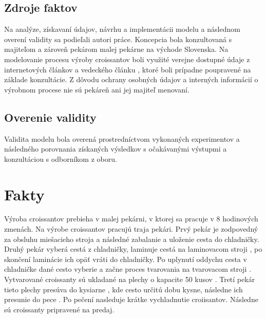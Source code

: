 \documentclass[11pt]{article}
\begin{document}
\subsection{Zdroje faktov}
Na analýze, získavaní údajov, návrhu a implementácii modelu a následnom overení validity sa podieľali autori práce. Koncepcia bola konzultovaná s majiteľom a zároveň pekárom malej pekárne na východe Slovenska. Na modelovanie procesu výroby croissantov boli využité verejne dostupné údaje z internetových článkov a vedeckého článku \cite{MUTCHADEJ2025101370}, ktoré boli prípadne poupravené na základe konzultácie. Z dôvodu ochrany osobných údajov a interných informácií o výrobnom procese nie sú pekáreň ani jej majiteľ menovaní.

\subsection{Overenie validity}
Validita modelu bola overená prostredníctvom vykonaných experimentov a následného porovnania získaných výsledkov s očakávanými výstupmi a konzultáciou s odborníkom z oboru.

\section{Fakty}
Výroba croissantov prebieha v malej pekárni, v ktorej sa pracuje v 8 hodinových zmenách.
Na výrobe croissantov pracujú traja pekári. Prvý pekár je zodpovedný za obsluhu miešacieho stroja \cite{sancassiano_plus} a následné zabalanie a uloženie cesta do chladničky. Druhý pekár vyberá cestá z chladničky, laminuje cestá na laminovacom stroji \cite{ lamination_machine_croissant}, po skončení laminácie ich opäť vráti do chladničky. Po uplynutí oddychu cesta v chladničke dané cesto vyberie a začne proces tvarovania na tvarovacom stroji \cite{shaper_machine_croissant}. Vytvarované croissanty sú ukladané na plechy o kapacite 50 kusov \cite{pecne_plechy_vlnite}. Tretí pekár tieto plechy presúva do kysiarne \cite{malac_kynarna_cla124}, kde cesto určitú dobu kysne, následne ich presunie do pece \cite{malac_baby-rotor-el-60-40}. Po pečení nasleduje krátke vychladnutie croiisantov. Následne sú croissanty pripravené na predaj.
\end{document}
